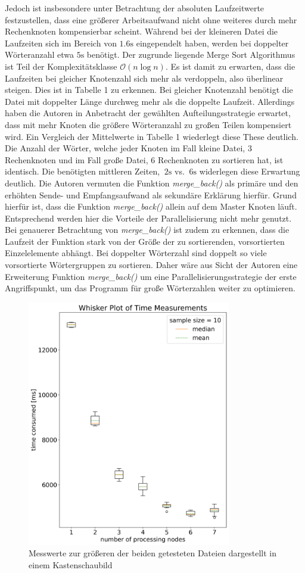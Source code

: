 Jedoch ist insbesondere unter Betrachtung der absoluten Laufzeitwerte festzustellen, dass eine größerer Arbeitsaufwand nicht ohne weiteres durch mehr Rechenknoten kompensierbar scheint. Während bei der kleineren Datei die Laufzeiten sich im Bereich von $1.6\mathrm{s}$ eingependelt haben, werden bei doppelter Wörteranzahl etwa $5\mathrm{s}$ benötigt. Der zugrunde liegende Merge Sort Algorithmus ist Teil der Komplexitätsklasse ${\mathcal{O}(n\log{n})}$. Es ist damit zu erwarten, dass die Laufzeiten bei gleicher Knotenzahl sich mehr als verdoppeln, also überlinear steigen. Dies ist in Tabelle 1 zu erkennen. Bei gleicher Knotenzahl benötigt die Datei mit doppelter Länge durchweg mehr als die doppelte Laufzeit. Allerdings haben die Autoren in Anbetracht der gewählten Aufteilungsstrategie erwartet, dass mit mehr Knoten die größere Wörteranzahl zu großen Teilen kompensiert wird. Ein Vergleich der Mittelwerte in Tabelle 1 wiederlegt diese These deutlich. Die Anzahl der Wörter, welche jeder Knoten im Fall \glqq kleine Datei, 3 Rechenknoten\grqq{} und im Fall \glqq große Datei, 6 Rechenknoten\grqq{} zu sortieren hat, ist identisch. Die benötigten mittleren Zeiten, $~2\mathrm{s}$ vs. $~6\mathrm{s}$ widerlegen diese Erwartung deutlich. Die Autoren vermuten die Funktion \textit{merge\_back()} als primäre und den erhöhten Sende- und Empfangsaufwand als sekundäre Erklärung hierfür. Grund hierfür ist, dass die Funktion \textit{merge\_back()} allein auf dem Master Knoten läuft. Entsprechend werden hier die Vorteile der Parallelisierung nicht mehr genutzt. Bei genauerer Betrachtung von \textit{merge\_back()} ist zudem zu erkennen, dass die Laufzeit der Funktion stark von der Größe der zu sortierenden, vorsortierten Einzelelemente abhängt. Bei doppelter Wörterzahl sind doppelt so viele vorsortierte Wörtergruppen zu sortieren. Daher wäre aus Sicht der Autoren eine Erweiterung Funktion \textit{merge\_back()} um eine Parallelisierungsstrategie der erste Angriffspunkt, um das Programm für große Wörterzahlen weiter zu optimieren.\\
\begin{figure}[!t]
	\centering
	\includegraphics[width=3.5in]{boxplots_long.png}
	\caption{Messwerte zur größeren der beiden getesteten Dateien dargestellt in einem Kastenschaubild}
	\label{boxplot_times_long}
\end{figure}